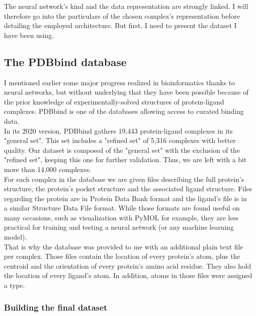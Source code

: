 \documentclass{article}
\begin{document}
The neural network's kind and the data representation are strongly linked. I will therefore go into the particulars of the chosen complex's representation before detailing the employed architecture. But first, I need to present the dataset I have been using.

\subsection{The PDBbind database}
\label{sec:pdbbind}

I mentioned earlier some major progress realized in bioinformatics thanks to neural networks, but without underlying that they have been possible because of the prior knowledge of experimentally-solved structures of protein-ligand complexes. PDBbind \cite{PDBbind} is one of the databases allowing access to curated binding data. \\
In its 2020 version, PDBbind gathers 19,443 protein-ligand complexes in its "general set". This set includes a "refined set" of 5,316 complexes with better quality. Our dataset is composed of the "general set" with the exclusion of the "refined set", keeping this one for further validation. Thus, we are left with a bit more than 14,000 complexes. \\

For each complex in the database we are given files describing the full protein's structure, the protein's pocket structure and the associated ligand structure. Files regarding the protein are in Protein Data Bank format \cite{PDB} and the ligand's file is in a similar Structure Data File format. While those formats are found useful on many occasions, such as visualization with PyMOL for example, they are less practical for training and testing a neural network (or any machine learning model). \\
That is why the database was provided to me with an additional plain text file per complex. Those files contain the location of every protein's atom, plus the centroid and the orientation of every protein's amino acid residue. They also hold the location of every ligand's atom. In addition, atoms in those files were assigned a type. \\

\subsubsection{Building the final dataset}
\label{sec:dataset}
\end{document}
